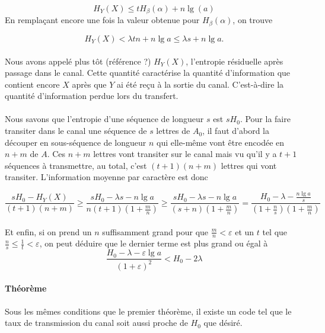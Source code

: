 	\[H_Y(X)\le t H_\beta(\alpha) + n \lg(a)\]
	En remplaçant encore une fois la valeur obtenue pour $H_\beta(\alpha)$, 
	on trouve
	
	\[H_Y(X)<\lambda t n + n \lg a \le \lambda s+n \lg a.\]
	
	\paragraph{}
	Nous avons appelé plus tôt (référence ?) $H_Y(X)$, l'entropie résiduelle 
	après passage dans le canal. Cette quantité caractérise la quantité 
	d'information que contient encore $X$ après que $Y$ ai été reçu à la 
	sortie du canal. C'est-à-dire la quantité d'information perdue lors 
	du transfert.
	
	\paragraph{}
	Nous savons que l'entropie d'une séquence de longueur $s$ est $sH_0$. 
	Pour la faire transiter dans le canal une séquence de $s$ lettres de $A_0$,
	il faut d'abord la découper en sous-séquence de longueur $n$ qui elle-même 
	vont être encodée en $n+m$ de $A$. Ces $n+m$ lettres vont transiter sur le 
	canal mais vu qu'il y a $t+1$ séquences à transmettre, au total, c'est 
	$(t+1)(n+m)$ lettres qui vont transiter. L'information moyenne par 
	caractère est donc
	
	\[
		\frac{sH_0-H_Y(X)}{(t+1)(n+m)} \ge 
		\frac{sH_0-\lambda s-n\lg a}{n(t+1)(1+\frac{m}{n})} \ge 
		\frac{sH_0-\lambda s-n\lg a}{(s+n)(1+\frac{m}{n})} = 
		\frac{H_0-\lambda-\frac{n\lg a}{s}}{(1+\frac{n}{s})(1+\frac{m}{n})}
	\]
	
	\paragraph{}
	Et enfin, si on prend un $n$ suffisamment grand pour que 
	$\frac{m}{n}<\varepsilon$ et un $t$ tel que
	$\frac{n}{s} \le \frac{1}{t} < \varepsilon$, on peut 
	déduire que le dernier terme est plus grand ou égal à
	\[\frac{H_0-\lambda-\varepsilon\lg a}{(1+\varepsilon)^2}<H_0-2\lambda\]
	
	
	
	
	
	
	
	
	\paragraph{Théorème}
	Sous les mêmes conditions que le premier théorème, il existe un code tel
	que le taux de transmission du canal soit aussi proche de $H_0$ que désiré.

